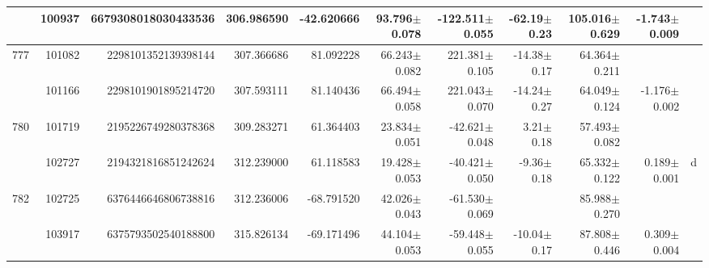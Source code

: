 \documentclass{ws-ijmpd}
\begin{document}
\begin{landscape}
\begin{longtable}{rrrrrrrrrrl}
            &  100937 &      6679308018030433536 &                   306.986590 &                   -42.620666 &                 93.796$\pm$0.078 &               -122.511$\pm$0.055 &         -62.19$\pm$  0.23 &       105.016$\pm$0.629 &                          -1.743$\pm$0.009 &                                                    \\
 \hline 777 &  101082 &      2298101352139398144 &                   307.366686 &                    81.092228 &                 66.243$\pm$0.082 &                221.381$\pm$0.105 &         -14.38$\pm$  0.17 &        64.364$\pm$0.211 &                                           &                                                    \\
            &  101166 &      2298101901895214720 &                   307.593111 &                    81.140436 &                 66.494$\pm$0.058 &                221.043$\pm$0.070 &         -14.24$\pm$  0.27 &        64.049$\pm$0.124 &                          -1.176$\pm$0.002 &                                                    \\
 \hline 780 &  101719 &      2195226749280378368 &                   309.283271 &                    61.364403 &                 23.834$\pm$0.051 &                -42.621$\pm$0.048 &           3.21$\pm$  0.18 &        57.493$\pm$0.082 &                                           &                                                    \\
            &  102727 &      2194321816851242624 &                   312.239000 &                    61.118583 &                 19.428$\pm$0.053 &                -40.421$\pm$0.050 &          -9.36$\pm$  0.18 &        65.332$\pm$0.122 &                           0.189$\pm$0.001 &                                                  d \\
 \hline 782 &  102725 &      6376446646806738816 &                   312.236006 &                   -68.791520 &                 42.026$\pm$0.043 &                -61.530$\pm$0.069 &                           &        85.988$\pm$0.270 &                                           &                                                    \\
            &  103917 &      6375793502540188800 &                   315.826134 &                   -69.171496 &                 44.104$\pm$0.053 &                -59.448$\pm$0.055 &         -10.04$\pm$  0.17 &        87.808$\pm$0.446 &                           0.309$\pm$0.004 &                                                    \\

\end{longtable}
\end{landscape}
\end{document}
